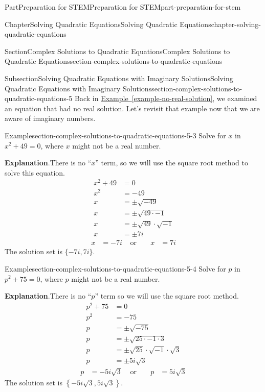 \documentclass[twoside,10pt,]{book}
\newcommand{\blocktitlefont}{\relax}
\newcommand{\xreffont}{\relax}
\numberwithin{equation}{section}
\newcommand{\amp}{&}
\begin{document}
\begin{partptx}{Part}{Preparation for STEM}{}{Preparation for STEM}{}{}{part-preparation-for-stem}
\begin{chapterptx}{Chapter}{Solving Quadratic Equations}{}{Solving Quadratic Equations}{}{}{chapter-solving-quadratic-equations}
\begin{sectionptx}{Section}{Complex Solutions to Quadratic Equations}{}{Complex Solutions to Quadratic Equations}{}{}{section-complex-solutions-to-quadratic-equations}
\begin{subsectionptx}{Subsection}{Solving Quadratic Equations with Imaginary Solutions}{}{Solving Quadratic Equations with Imaginary Solutions}{}{}{section-complex-solutions-to-quadratic-equations-5}
Back in \hyperref[example-no-real-solution]{Example~{\xreffont\ref{example-no-real-solution}}}, we examined an equation that had no real solution. Let's revisit that example now that we are aware of imaginary numbers.%
\begin{example}{Example}{}{section-complex-solutions-to-quadratic-equations-5-3}%
Solve for \(x\) in \(x^2+49=0\), where \(x\) might not be a real number.%
\par\smallskip%
{\makeatletter{}\makeatother\noindent\textbf{\blocktitlefont Explanation}.\hypertarget{section-complex-solutions-to-quadratic-equations-5-3-2}{}\quad{}There is no ``\(x\)'' term, so we will use the square root method to solve this equation.%
\begin{align*}
x^2+49\amp=0\\
x^2\amp=-49\\
x\amp=\pm\sqrt{-49}\\
x\amp=\pm\sqrt{49\cdot-1}\\
x\amp=\pm\sqrt{49}\cdot\sqrt{-1}\\
x\amp=\pm 7i
\end{align*}
%
\begin{align*}
x\amp=-7i\amp\text{ or }\amp\amp x\amp=7i
\end{align*}
The solution set is \(\{-7i,7i\}\).%
}\end{example}
\begin{example}{Example}{}{section-complex-solutions-to-quadratic-equations-5-4}%
Solve for \(p\) in \(p^2+75=0\), where \(p\) might not be a real number.%
\par\smallskip%
{\makeatletter{}\makeatother\noindent\textbf{\blocktitlefont Explanation}.\hypertarget{section-complex-solutions-to-quadratic-equations-5-4-2}{}\quad{}There is no ``\(p\)'' term so we will use the square root method.%
\begin{align*}
p^2+75\amp=0\\
p^2\amp=-75\\
p\amp=\pm\sqrt{-75}\\
p\amp=\pm\sqrt{25\cdot-1\cdot3}\\
p\amp=\pm\sqrt{25}\cdot\sqrt{-1}\cdot\sqrt{3}\\
p\amp=\pm 5i\sqrt{3}
\end{align*}
%
\begin{align*}
p\amp=-5i\sqrt{3}\amp\text{ or }\amp\amp p\amp=5i\sqrt{3}
\end{align*}
The solution set is \(\left\{-5i\sqrt{3},5i\sqrt{3}\right\}\).%
}\end{example}

\end{subsectionptx}
\end{sectionptx}
\end{chapterptx}
\end{partptx}
\end{document}
